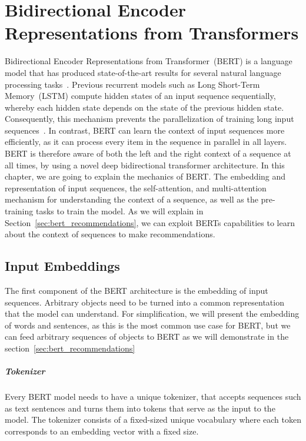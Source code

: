 \chapter{Bidirectional Encoder Representations from Transformers}
\label{sec:bert}

Bidirectional Encoder Representations from Transformer~(BERT) is a language model that has produced state-of-the-art results for several natural language processing tasks~\cite{devlin2018bert}. Previous recurrent models such as Long Short-Term Memory~(LSTM) compute hidden states of an input sequence sequentially, whereby each hidden state depends on the state of the previous hidden state. Consequently, this mechanism prevents the parallelization of training long input sequences~\cite{vaswani2017attention}. In contrast, BERT can learn the context of input sequences more efficiently, as it can process every item in the sequence in parallel in all layers. BERT is therefore aware of both the left and the right context of a sequence at all times, by using a novel deep bidirectional transformer architecture. In this chapter, we are going to explain the mechanics of BERT. The embedding and representation of input sequences, the self-attention, and multi-attention mechanism for understanding the context of a sequence, as well as the pre-training tasks to train the model. As we will explain in Section~\ref{sec:bert_recommendations}, we can exploit BERTs capabilities to learn about the context of sequences to make recommendations.


\section{Input Embeddings}
\label{sec:embeddings}
The first component of the BERT architecture is the embedding of input sequences. Arbitrary objects need to be turned into a common representation that the model can understand. For simplification, we will present the embedding of words and sentences, as this is the most common use case for BERT, but we can feed arbitrary sequences of objects to BERT as we will demonstrate in the section~\ref{sec:bert_recommendations}

\paragraph{Tokenizer}
Every BERT model needs to have a unique tokenizer, that accepts sequences such as text sentences and turns them into tokens that serve as the input to the model. The tokenizer consists of a fixed-sized unique vocabulary where each token corresponds to an embedding vector with a fixed size.  

